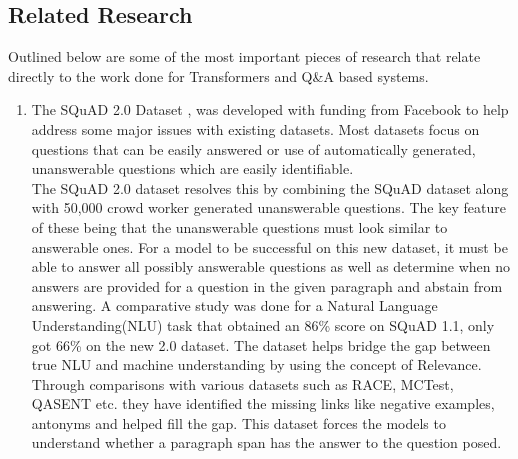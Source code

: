 \documentclass[11pt]{article}
\begin{document}
	\subsection{Related Research}\label{rr}
	Outlined below are some of the most important pieces of research that relate directly to the work done for Transformers and Q\&A based systems.
	\begin{enumerate}
		\item The SQuAD 2.0 Dataset \citep{dataset}, was developed with funding from Facebook to help address some major issues with existing datasets. Most datasets focus on questions that can be easily answered or use of automatically generated, unanswerable questions which are easily identifiable.\\
		The SQuAD 2.0 dataset resolves this by combining the SQuAD dataset along with 50,000 crowd worker generated unanswerable questions. The key feature of these being that the unanswerable questions must look similar to answerable ones. For a model to be successful on this new dataset, it must be able to answer all possibly answerable questions as well as determine when no answers are provided for a question in the given paragraph and abstain from answering. A comparative study was done for a Natural Language Understanding(NLU) task that obtained an 86\% score on SQuAD 1.1, only got 66\% on the new 2.0 dataset.
		The dataset helps bridge the gap between true NLU and machine understanding by using the concept of Relevance. Through comparisons with various datasets such as RACE, MCTest, QASENT etc. they have identified the missing links like negative examples, antonyms and helped fill the gap. This dataset forces the models to understand whether a paragraph span has the answer to the question posed.


\end{enumerate}
\end{document}
